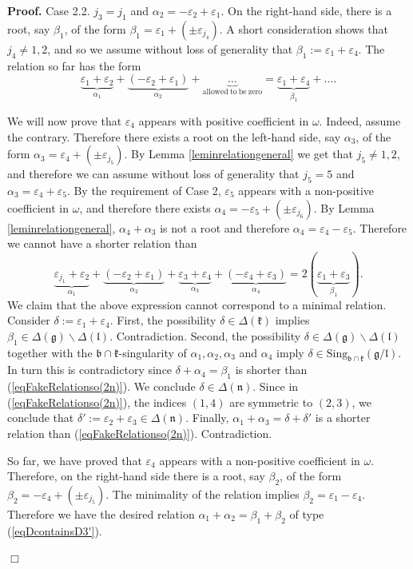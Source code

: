 \documentclass[12pt]{report}
\newenvironment{proof}[1][]{ \textbf{Proof#1. }}{$\Box$\medskip}
\newcommand{\kk}{\mathfrak{k}}
\newcommand{\nn}{\mathfrak{n}}
\newcommand{\gG}{\mathfrak{g}}
\newcommand{\bb}{\mathfrak{b}}
\newcommand{\lL}{\mathfrak{l}}
\newcommand{\refle}[1]{Lemma \ref{#1}}
\newcommand{\refeq}[1]{(\ref{#1})}
\newcommand{\hw}{\mathrm{Sing}}
\newcommand{\eps}{\varepsilon}
\newcommand{\pmf}[1]{ \pm}%
\begin{document}
\begin{proof}
\noindent Case 2.2. $j_3=j_1$ and $\alpha_2=-\eps_{2}+\eps_{1} $. On the right-hand side, there is a root, say $\beta_1$, of the form $\beta_1=\eps_{1}+(\pmf{j_4}\eps_{j_4})$. A short consideration shows that $j_4\neq 1,2$, and so we assume without loss of generality that $\beta_1:=\eps_{1}+\eps_{4}$. The relation so far has the form
\[
\underbrace{\eps_{1}+\eps_{2}}_{\alpha_1} +\underbrace{(-\eps_{2}+\eps_{1})}_{\alpha_2}+\underbrace{\dots}_{\mathrm{allowed~to~be~zero}} =\underbrace{\eps_{1}+\eps_{4}}_{\beta_1}+\dots.
\]

We will now prove that $\eps_{4}$ appears with positive coefficient in $\omega$. Indeed, assume the contrary. Therefore there exists a root on the left-hand side, say $\alpha_3$, of the form $\alpha_3= \eps_{4}+ (\pmf{j_5}\eps_{j_5})$. By \refle{leminrelationgeneral} we get that $j_5\neq 1,2$, and therefore we can assume without loss of generality that $j_5=5$ and $\alpha_3= \eps_{4} +\eps_{5}$. By the requirement of Case 2, $\eps_5$ appears with a non-positive coefficient in $\omega$, and therefore there exists $\alpha_4=-\eps_5+(\pmf{j_6}\eps_{j_6})$. By \refle{leminrelationgeneral}, $\alpha_4+\alpha_3$ is not a root and therefore $\alpha_{4}= \eps_{4} -\eps_{5}$. Therefore we cannot have a shorter relation than
\begin{equation}\label{eqFakeRelationso(2n)}
\underbrace{\eps_{j_1}+\eps_{2}}_{\alpha_1}+ \underbrace{(-\eps_{2}+\eps_{1})}_{\alpha_2}+\underbrace{ \eps_{3}+ \eps_{4}}_{\alpha_3}+ \underbrace{(-\eps_{4}+\eps_{3})}_{\alpha_4}= 2(\underbrace{\eps_{1}+\eps_{3}}_{\beta_1}).
\end{equation}
We claim that the above expression cannot correspond to a minimal relation. Consider $\delta:= \eps_{1}+\eps_{4}$. First, the possibility $\delta \in \Delta(\kk)$ implies $\beta_1 \in\Delta(\gG)\backslash\Delta(\lL)$. Contradiction. Second, the possibility $\delta\in \Delta(\gG) \backslash \Delta(\lL)$ together with the $\bb \cap \kk$-singularity of $\alpha_1,\alpha_2,\alpha_3$ and $\alpha_4$ imply $\delta \in \hw_{\bb\cap\kk}(\gG/\lL)$. In turn this is contradictory since $\delta + \alpha_4 = \beta_1$ is shorter than (\ref{eqFakeRelationso(2n)}). We conclude $\delta\in\Delta(\nn)$. Since in (\ref{eqFakeRelationso(2n)}), the indices $(1,4)$ are symmetric to $(2,3)$, we conclude that $\delta':= \eps_{2} +\eps_{3} \in\Delta(\nn)$. Finally, $\alpha_1+ \alpha_3 = \delta + \delta'$ is a shorter relation than (\ref{eqFakeRelationso(2n)}). Contradiction.

So far, we have proved that  $\eps_{4}$ appears with a non-positive coefficient in $\omega$. Therefore, on the right-hand side there is a root, say $\beta_2$, of the form $\beta_2= -\eps_{4}+( \pmf{j_5}\eps_{j_5})$. The minimality of the relation implies $\beta_2=\eps_1-\eps_4$. Therefore we have the desired relation $\alpha_1+\alpha_2=\beta_1+\beta_2$ of type \refeq{eqDcontainsD3'}.


\end{proof}
\end{document}
